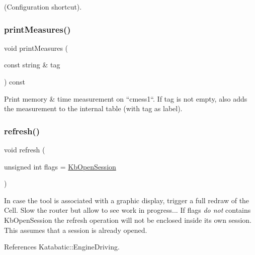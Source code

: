 (Configuration shortcut). \mbox{\label{classKatabatic_1_1KatabaticEngine_a2ea4b4fc379fb85a13890db451cbf93a}} 
\subsubsection{\texorpdfstring{print\+Measures()}{printMeasures()}}
{\footnotesize\ttfamily void print\+Measures (\begin{DoxyParamCaption}\item[{const string \&}]{tag }\end{DoxyParamCaption}) const}

Print memory \& time measurement on ``cmess1``. If {\ttfamily tag} is not empty, also adds the measurement to the internal table (with {\ttfamily tag} as label). \mbox{\label{classKatabatic_1_1KatabaticEngine_a1e9bb62be35c6a415a1950c72c1964ef}} 
\subsubsection{\texorpdfstring{refresh()}{refresh()}}
{\footnotesize\ttfamily void refresh (\begin{DoxyParamCaption}\item[{unsigned int}]{flags = {\ttfamily \hyperlink{namespaceKatabatic_a2af2ad6b6441614038caf59d04b3b217af314588109fcc5f5ee1c42e5fd4d0ed5}{Kb\+Open\+Session}} }\end{DoxyParamCaption})}

In case the tool is associated with a graphic display, trigger a full redraw of the Cell. Slow the router but allow to see work in progress... If {\ttfamily flags} {\itshape do not} contains {\ttfamily Kb\+Open\+Session} the refresh operation will not be enclosed inside it\textquotesingle{}s own session. This assumes that a session is already opened. 

References Katabatic\+::\+Engine\+Driving.

\mbox{\label{classKatabatic_1_1KatabaticEngine_a1b7d8ed09a198f7afd6e3ac911f6eb37}} 
